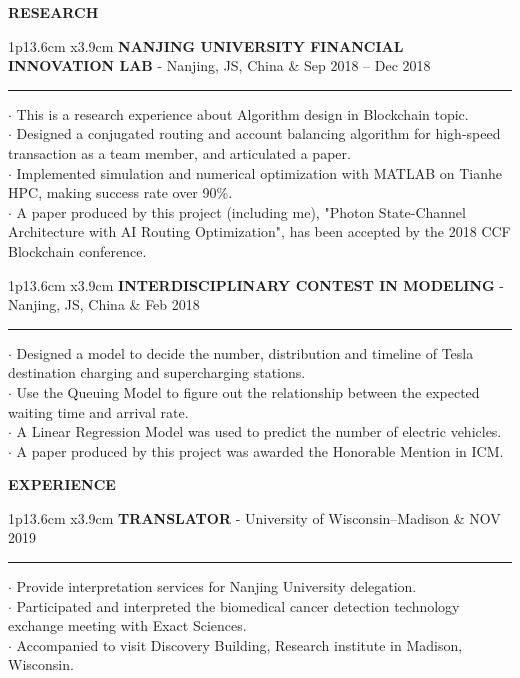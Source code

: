 \documentclass[11pt,A4]{article}
\newcommand{\cvsection}[1]
{
	\begin{center}
		\large\textcolor{sectcol}{\textbf{#1}}
	\end{center}
}
\newcommand{\cvevent}[3]
{

\begin{tabular*}{1\textwidth}{p{13.6cm}  x{3.9cm}}
	\textbf{#2} - \textcolor{bgcol}{#3} &   \vspace{2.5pt}\textcolor{sectcol}{#1}
\end{tabular*}

\vspace{-8pt}
\textcolor{softcol}{\hrule}
\vspace{6pt}


}
\begin{document}
\cvsection{RESEARCH}

\cvevent{Sep 2018 – Dec 2018}
        {NANJING UNIVERSITY FINANCIAL INNOVATION LAB}
        {Nanjing, JS, China}

        $\cdot$ This is a research experience about Algorithm design in Blockchain topic.\\
        $\cdot$ Designed a conjugated routing and account balancing algorithm for
                high-speed transaction as a team member, and articulated a paper.\\
        $\cdot$ Implemented simulation and numerical optimization with MATLAB on Tianhe HPC, 
                making success rate over 90\%.\\
        $\cdot$ A paper produced by this project (including me), 
                "Photon State-Channel Architecture with AI Routing Optimization", 
                has been accepted by the 2018 CCF Blockchain conference.\\

\cvevent{Feb 2018}
        {INTERDISCIPLINARY CONTEST IN MODELING}
        {Nanjing, JS, China}

        $\cdot$ Designed a model to decide the number,
                distribution and timeline of Tesla destination charging 
                and supercharging stations.\\
        $\cdot$ Use the Queuing Model to figure out the relationship between 
                the expected waiting time and arrival rate.\\
        $\cdot$ A Linear Regression Model was used to predict the number of electric vehicles.\\
        $\cdot$ A paper produced by this project was awarded the Honorable Mention in ICM.\\



\cvsection{EXPERIENCE}
\cvevent{NOV 2019}
        {TRANSLATOR}
        {University of Wisconsin–Madison}

        $\cdot$ Provide interpretation services for Nanjing University delegation.\\
        $\cdot$ Participated and interpreted the biomedical cancer detection 
                technology exchange meeting with Exact Sciences.\\
        $\cdot$ Accompanied to visit Discovery Building, Research institute in Madison, Wisconsin.\\
\end{document}
